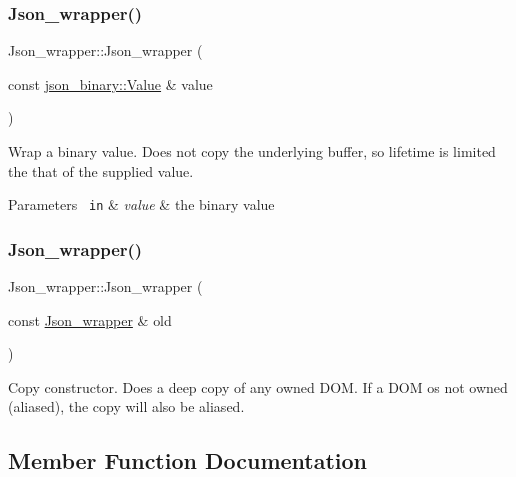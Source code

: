 \subsubsection{\texorpdfstring{Json\+\_\+wrapper()}{Json\_wrapper()}\hspace{0.1cm}{\footnotesize\ttfamily [3/4]}}
{\footnotesize\ttfamily Json\+\_\+wrapper\+::\+Json\+\_\+wrapper (\begin{DoxyParamCaption}\item[{const \mbox{\hyperlink{classjson__binary_1_1Value}{json\+\_\+binary\+::\+Value}} \&}]{value }\end{DoxyParamCaption})\hspace{0.3cm}{\ttfamily [explicit]}}

Wrap a binary value. Does not copy the underlying buffer, so lifetime is limited the that of the supplied value.


\begin{DoxyParams}[1]{Parameters}
\mbox{\texttt{ in}}  & {\em value} & the binary value \\
\hline
\end{DoxyParams}
\mbox{\label{classJson__wrapper_a461e9b2ccefcd932f7d93294751c7296}} 
\subsubsection{\texorpdfstring{Json\+\_\+wrapper()}{Json\_wrapper()}\hspace{0.1cm}{\footnotesize\ttfamily [4/4]}}
{\footnotesize\ttfamily Json\+\_\+wrapper\+::\+Json\+\_\+wrapper (\begin{DoxyParamCaption}\item[{const \mbox{\hyperlink{classJson__wrapper}{Json\+\_\+wrapper}} \&}]{old }\end{DoxyParamCaption})}

Copy constructor. Does a deep copy of any owned D\+OM. If a D\+OM os not owned (aliased), the copy will also be aliased. 

\subsection{Member Function Documentation}
\mbox{\label{classJson__wrapper_a7c56a53339d7a17885cdfd5177089cf8}} 
